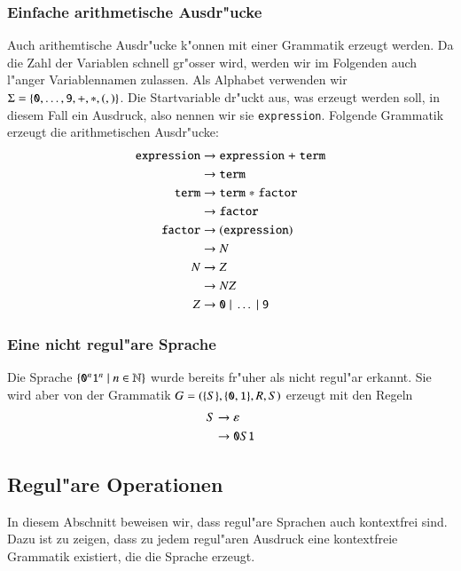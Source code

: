 \subsubsection{Einfache arithmetische Ausdr"ucke}
Auch arithemtische Ausdr"ucke k"onnen mit einer
Grammatik erzeugt werden. Da die Zahl der Variablen schnell gr"osser
wird, werden wir im Folgenden auch l"anger Variablennamen zulassen.
Als Alphabet verwenden wir
$\Sigma=\{{\tt 0},\dots,{\tt 9},{\tt +},{\tt *},{\tt (}, {\tt )}\}$.
Die Startvariable dr"uckt aus, was erzeugt werden soll, in diesem Fall
ein Ausdruck, also nennen wir sie {\tt expression}.  Folgende Grammatik
erzeugt die arithmetischen Ausdr"ucke:
\begin{align*}
\text{\tt expression} &\to \text{\tt expression}\;{\tt +}\;\text{\tt term}\\
                      &\to \text{\tt term}\\
\text{\tt term}       &\to \text{\tt term}\;{\tt *}\;\text{\tt factor}\\
                      &\to \text{\tt factor}\\
\text{\tt factor}     &\to {\tt (}\text{\tt expression}{\tt )}\\
                      &\to N\\
N                     &\to Z\\
                      &\to NZ\\
Z                     &\to {\tt 0}\;|\;\dots \;|\;{\tt 9}
\end{align*}

\subsubsection{Eine nicht regul"are Sprache}
Die Sprache $\{{\tt 0}^n{\tt 1}^n\;|\;n\in\mathbb N\}$ wurde bereits
fr"uher als nicht regul"ar erkannt. Sie wird aber von der 
Grammatik $G=(\{S\}, \{{\tt 0},{\tt 1}\}, R, S)$ erzeugt
mit den Regeln
\begin{align*}
S&\rightarrow \varepsilon\\
&\rightarrow {\tt 0}S{\tt 1}
\end{align*}

\subsection{Regul"are Operationen}
In diesem Abschnitt beweisen wir, dass regul"are Sprachen auch
kontextfrei sind. Dazu ist zu zeigen, dass
zu jedem regul"aren Ausdruck eine kontextfreie Grammatik existiert,
die die Sprache erzeugt.

